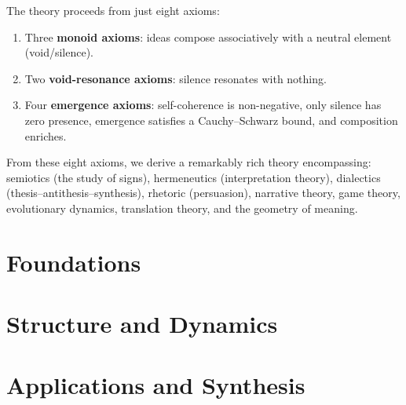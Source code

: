 \documentclass[11pt,oneside]{book}
\theoremstyle{plain}
\theoremstyle{definition}
\theoremstyle{remark}
\begin{document}
\vspace{1em}

The theory proceeds from just eight axioms:
\begin{enumerate}
\item Three \textbf{monoid axioms}: ideas compose associatively with a neutral element (void/silence).
\item Two \textbf{void-resonance axioms}: silence resonates with nothing.
\item Four \textbf{emergence axioms}: self-coherence is non-negative, only silence has zero presence,
emergence satisfies a Cauchy--Schwarz bound, and composition enriches.
\end{enumerate}

From these eight axioms, we derive a remarkably rich theory encompassing:
semiotics (the study of signs), hermeneutics (interpretation theory),
dialectics (thesis--antithesis--synthesis), rhetoric (persuasion),
narrative theory, game theory, evolutionary dynamics, translation theory,
and the geometry of meaning.

\tableofcontents

\mainmatter

\part{Foundations}



\part{Structure and Dynamics}



\part{Applications and Synthesis}



\end{document}
